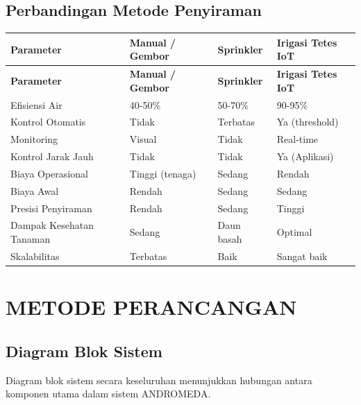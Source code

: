 \documentclass[12pt,a4paper,oneside]{report}
\begin{document}
\section{Perbandingan Metode Penyiraman}

\begin{table}[H]
\centering
\caption{Perbandingan Metode Penyiraman Tanaman}
\label{tab:watering-methods}
\begin{longtable}{p{3cm} p{3.5cm} p{3.5cm} p{3.5cm}}
\toprule
\textbf{Parameter} & \textbf{Manual / Gembor} & \textbf{Sprinkler} & \textbf{Irigasi Tetes IoT} \\
\midrule
\endfirsthead
\toprule
\textbf{Parameter} & \textbf{Manual / Gembor} & \textbf{Sprinkler} & \textbf{Irigasi Tetes IoT} \\
\midrule
\endhead
\bottomrule
\endfoot
Efisiensi Air & 40-50\% & 50-70\% & 90-95\% \\
Kontrol Otomatis & Tidak & Terbatas & Ya (threshold) \\
Monitoring & Visual & Tidak & Real-time \\
Kontrol Jarak Jauh & Tidak & Tidak & Ya (Aplikasi) \\
Biaya Operasional & Tinggi (tenaga) & Sedang & Rendah \\
Biaya Awal & Rendah & Sedang & Sedang \\
Presisi Penyiraman & Rendah & Sedang & Tinggi \\
Dampak Kesehatan Tanaman & Sedang & Daun basah & Optimal \\
Skalabilitas & Terbatas & Baik & Sangat baik \\
\bottomrule
\end{longtable}
\end{table}


\chapter{METODE PERANCANGAN}

\section{Diagram Blok Sistem}

Diagram blok sistem secara keseluruhan menunjukkan hubungan antara komponen utama dalam sistem ANDROMEDA.
\end{document}
